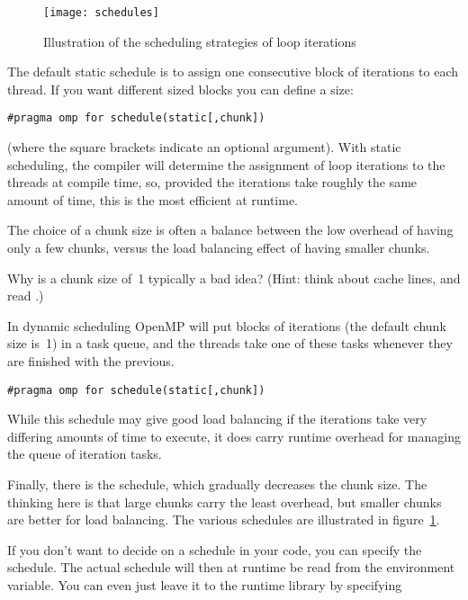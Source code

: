 \begin{figure}[ht]
  \texttt{[image: schedules]}
  \caption{Illustration of the scheduling strategies of loop iterations}
  \label{fig:omp-schedule}
\end{figure}

The default static schedule is to assign one consecutive block of
iterations to each thread. If you want different sized blocks you can
define a  size:
\begin{lstlisting}
#pragma omp for schedule(static[,chunk])
\end{lstlisting}
(where the square brackets indicate an optional argument).
With static scheduling,
the compiler will determine the assignment of loop iterations to the threads
at compile time,
so,
provided the iterations take roughly the same amount of time,
this is the most efficient at runtime.

The choice of a chunk size is often a balance between the low overhead of having 
only a few chunks, versus the load balancing effect of having smaller chunks.
\begin{exercise}
  Why is a chunk size of~1 typically a bad idea? (Hint: think about
  cache lines, and read .)
\end{exercise}

In dynamic scheduling OpenMP will put blocks of iterations
(the default chunk size is~1) in a task queue, and the threads take one of these
tasks whenever they are finished with the previous.
\begin{lstlisting}
#pragma omp for schedule(static[,chunk])
\end{lstlisting}
While this schedule may give good load balancing if the iterations
take very differing amounts of time to execute, it does carry runtime
overhead for managing the queue of iteration tasks.

Finally, there is the  schedule, which gradually decreases the chunk size.
The thinking here is that large chunks carry the least overhead, but smaller chunks are better
for load balancing.
%
The various schedules are illustrated in figure~\ref{fig:omp-schedule}.

If you don't want to decide on a schedule in your code, you can
specify the  schedule. The actual
schedule will then at runtime be read from the
 environment variable. You can even just
leave it to the runtime library by specifying

